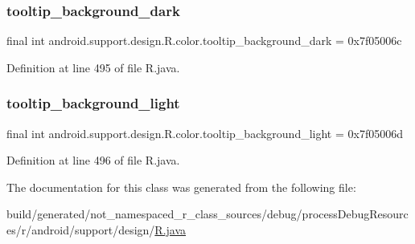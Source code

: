 \subsubsection{\texorpdfstring{tooltip\_background\_dark}{tooltip\_background\_dark}}
{\footnotesize\ttfamily final int android.\+support.\+design.\+R.\+color.\+tooltip\+\_\+background\+\_\+dark = 0x7f05006c\hspace{0.3cm}{\ttfamily [static]}}



Definition at line 495 of file R.\+java.

\mbox{\label{classandroid_1_1support_1_1design_1_1_r_1_1color_a0e4046f4766953991a1ac2f63727d588}} 
\subsubsection{\texorpdfstring{tooltip\_background\_light}{tooltip\_background\_light}}
{\footnotesize\ttfamily final int android.\+support.\+design.\+R.\+color.\+tooltip\+\_\+background\+\_\+light = 0x7f05006d\hspace{0.3cm}{\ttfamily [static]}}



Definition at line 496 of file R.\+java.



The documentation for this class was generated from the following file\+:\begin{DoxyCompactItemize}
\item 
build/generated/not\+\_\+namespaced\+\_\+r\+\_\+class\+\_\+sources/debug/process\+Debug\+Resources/r/android/support/design/\mbox{\hyperlink{android_2support_2design_2_r_8java}{R.\+java}}\end{DoxyCompactItemize}
